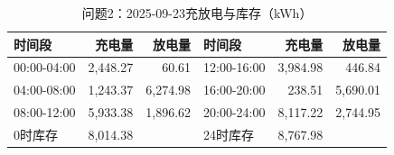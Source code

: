 \begin{table}[H]\centering\small\caption{问题2：2025-09-23充放电与库存（kWh）}\label{tab:q220250923b}
\begin{tabular}{lrrlrr}\toprule
时间段 & 充电量 & 放电量 & 时间段 & 充电量 & 放电量\\\midrule
00:00-04:00 & 2,448.27 & 60.61 & 12:00-16:00 & 3,984.98 & 446.84\\
04:00-08:00 & 1,243.37 & 6,274.98 & 16:00-20:00 & 238.51 & 5,690.01\\
08:00-12:00 & 5,933.38 & 1,896.62 & 20:00-24:00 & 8,117.22 & 2,744.95\\
0时库存 & 8,014.38 &  & 24时库存 & 8,767.98 & \\
\bottomrule\end{tabular}\end{table}
